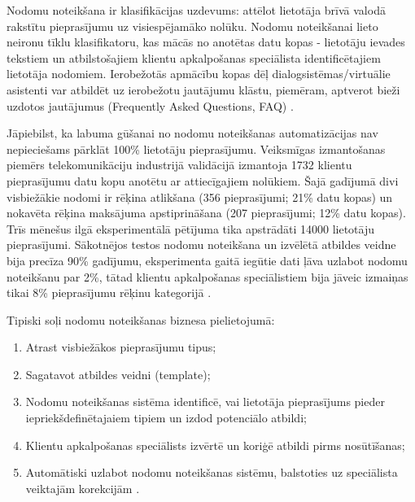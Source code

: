 
Nodomu noteikšana ir klasifikācijas uzdevums: attēlot lietotāja brīvā valodā rakstītu pieprasījumu uz visiespējamāko nolūku. Nodomu noteikšanai lieto neironu tīklu klasifikatoru, kas mācās no anotētas datu kopas - lietotāju ievades tekstiem un atbilstošajiem klientu apkalpošanas speciālista identificētajiem lietotāja nodomiem. Ierobežotās apmācību kopas dēļ dialogsistēmas/virtuālie asistenti var atbildēt uz ierobežotu jautājumu klāstu, piemēram, aptverot bieži uzdotos jautājumus (Frequently Asked Questions, FAQ) \cite{fasttext2019}.

Jāpiebilst, ka labuma gūšanai no nodomu noteikšanas automatizācijas nav nepieciešams pārklāt 100\% lietotāju pieprasījumu. Veiksmīgas izmantošanas piemērs telekomunikāciju industrijā validācijā izmantoja 1732 klientu pieprasījumu datu kopu anotētu ar attiecīgajiem nolūkiem. Šajā gadījumā divi visbiežākie nodomi ir rēķina atlikšana (356 pieprasījumi; 21\% datu kopas) un nokavēta rēķina maksājuma apstiprināšana (207 pieprasījumi; 12\% datu kopas). Trīs mēnešus ilgā eksperimentālā pētījuma tika apstrādāti 14000 lietotāju pieprasījumi. Sākotnējos testos nodomu noteikšana un izvēlētā atbildes veidne bija precīza 90\% gadījumu, eksperimenta gaitā iegūtie dati ļāva uzlabot nodomu noteikšanu par 2\%, tātad klientu apkalpošanas speciālistiem bija jāveic izmaiņas tikai 8\% pieprasījumu rēķinu kategorijā \cite{paikens2020}.

Tipiski soļi nodomu noteikšanas biznesa pielietojumā:
\begin{enumerate}
	\item Atrast visbiežākos pieprasījumu tipus;
	\item Sagatavot atbildes veidni (template);
	\item Nodomu noteikšanas sistēma identificē, vai lietotāja pieprasījums pieder iepriekšdefinētajaiem tipiem un izdod potenciālo atbildi;
	\item Klientu apkalpošanas speciālists izvērtē un koriģē atbildi pirms nosūtīšanas;
	\item Automātiski uzlabot nodomu noteikšanas sistēmu, balstoties uz speciālista veiktajām korekcijām \cite{paikens2020}.
\end{enumerate}

